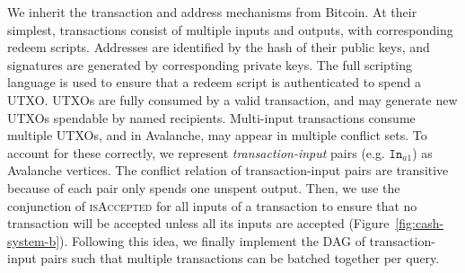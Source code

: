 \documentclass[letterpaper,twocolumn,10pt]{article}
\theoremstyle{definition}
\begin{document}
%
%
%    
%
We inherit the transaction and address mechanisms from Bitcoin. At their simplest, transactions consist of multiple inputs and outputs, with corresponding redeem scripts.
Addresses are identified by the hash of their public keys, and signatures are generated by corresponding private keys.
The full scripting language is used to ensure that a redeem script is authenticated to spend a UTXO\@.
UTXOs are fully consumed by a valid transaction, and may generate new UTXOs spendable by named recipients.
Multi-input transactions consume multiple UTXOs, and in Avalanche, may appear in multiple conflict sets.
To account for these correctly, we represent \emph{transaction-input} pairs (e.g. $\texttt{In}_{a1}$) as Avalanche vertices.
The conflict relation of transaction-input pairs are transitive because of each pair only spends one unspent output.
Then, we use the conjunction of \textsc{isAccepted} for all inputs of a transaction to ensure that no transaction will be accepted unless all its inputs are accepted (Figure~\ref{fig:cash-system-b}). 
Following this idea, we finally implement the DAG of transaction-input pairs such that multiple
transactions can be batched together per query.
\end{document}
